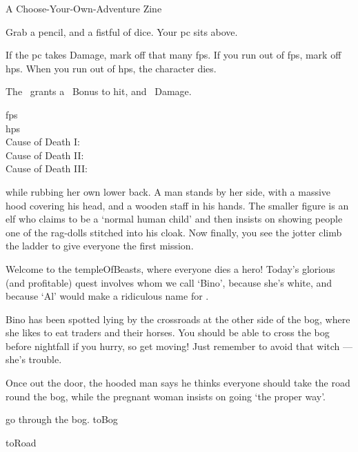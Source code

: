 \documentclass[10pt,twoside]{book}
\begin{document}
%
  {
    \vfill
    A Choose-Your-Own-Adventure Zine
  }

{
  \toggletrue{allyCharacter}
  \small
  \shortsword
  \noindent
  Grab a pencil, and a fistful of dice.
  Your \gls{pc} sits above.

  If the \gls{pc} takes Damage, mark off that many \glspl{fp}.
  If you run out of \glspl{fp}, mark off \glspl{hp}.
  When you run out of \glspl{hp}, the character dies.

  The \weaponName\ grants a ~Bonus to hit, and ~Damage.


  \begin{description}
    \item[\Glspl{fp}]
    \fpStat
    \item[\Glspl{hp}]
    \hpStat
    \item[Cause of Death I:]
    \bigLine
    \item[Cause of Death II:]
    \bigLine
    \item[Cause of Death III:]
    \bigLine
  \end{description}

}

\pagebreak
\pagestyle{minizine}

while rubbing her own lower back.
A man stands by her side, with a massive hood covering his head, and a wooden staff in his hands.
The smaller figure is an elf who claims to be a `normal human child' and then insists on showing people one of the rag-dolls stitched into his cloak.
Now finally, you see the \gls{jotter} climb the ladder to give everyone the first mission.

\begin{speechtext}
  Welcome to the \gls{templeOfBeasts}, where everyone dies a hero!
  Today's glorious (and profitable) quest involves  whom we call `Bino', because she's white, and because `Al' would make a ridiculous name for .

  Bino has been spotted lying by the crossroads at the other side of the bog, where she likes to eat traders and their horses.
  You should be able to cross the bog before nightfall if you hurry, so get moving!
  Just remember to avoid that \gls{witch} --- she's trouble.
\end{speechtext}

Once out the door, the hooded man says he thinks everyone should take the road round the bog, while the pregnant woman insists on going `the proper way'.

\begin{selectPath}
  {go through the bog.}%
  {toBog}

  {}%
  {toRoad}
\end{selectPath}
\end{document}

